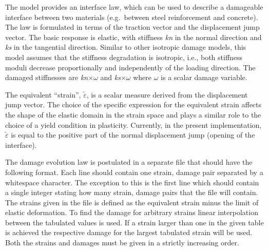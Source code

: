 \documentclass[a4paper]{article}
\newcommand{\param}[1]{{\it #1}}
\begin{document}
The model provides an interface law, which can be used to describe a damageable interface between two materials (e.g.\ between steel reinforcement and concrete). The law is formulated in terms of the traction vector and the displacement jump vector. The basic response is elastic, with stiffness \param{kn} in 
the normal direction and \param{ks} in the tangential direction.
Similar to other isotropic damage models, this model assumes that the stiffness degradation is isotropic, i.e., both stiffness moduli decrease proportionally and independently of the loading 
direction. The damaged stiffnesses are \param{kn}$\times\omega$ and \param{ks}$\times\omega$ where $\omega$ is a scalar damage variable.

The equivalent ``strain'', $\tilde\varepsilon$, is a scalar measure derived from the displacement jump vector. The choice of the specific expression
for the equivalent strain affects the shape of the elastic domain
in the strain space and plays a similar role to the choice of a yield
condition in plasticity.
Currently, in the present implementation,  $\tilde\varepsilon$ is equal to the positive part of the normal displacement jump (opening of the interface).

The damage evolution law is postulated in a separate file that should have the following format. Each line should contain one strain, damage pair separated by a whitespace character. The exception to this is the first line which should contain a single integer stating how many strain, damage pairs that the file will contain. The strains given in the file is defined as the equivalent strain minus the limit of elastic deformation.
To find the damage for arbitrary strains linear interpolation between the tabulated values is used. If a strain larger than one in the given table is achieved the respective damage for the largest tabulated strain will be used. Both the strains and damages must be given in a strictly increasing order.
\end{document}
